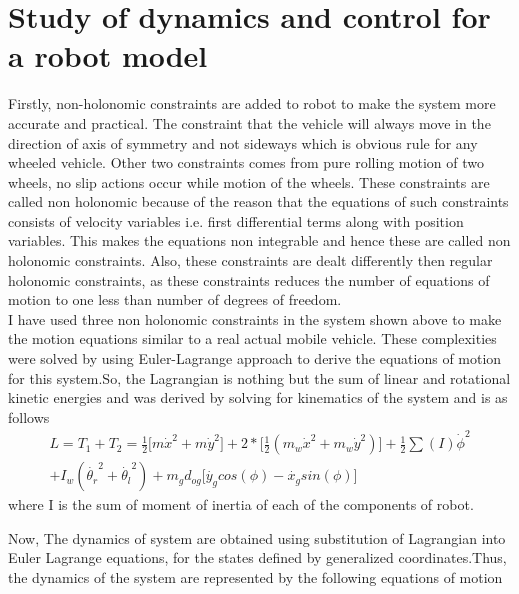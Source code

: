 \documentclass[12pt]{article}
\begin{document}
\section{Study of dynamics and control for a robot model}
Firstly, non-holonomic constraints are added to robot to make the system more accurate and practical. The constraint that the vehicle will always move in the direction of axis of symmetry and not sideways which is obvious rule for any wheeled vehicle. Other two constraints comes from pure rolling motion of two wheels, no slip actions occur while motion of the wheels. These constraints are called non holonomic because of the reason that the equations of such constraints consists of velocity variables i.e. first differential terms along with position variables. This makes the equations non integrable and hence these are called non holonomic constraints. Also, these constraints are dealt differently then regular holonomic constraints, as these constraints reduces the number of equations of motion to one less than number of degrees of freedom. 
\\ I have used three non holonomic constraints in the system shown above to make the motion equations similar to a real actual mobile vehicle. These complexities were solved by using Euler-Lagrange approach to derive the equations of motion for this system.So, the Lagrangian is nothing but the sum of linear and rotational kinetic energies and was derived by solving for kinematics of the system and is as follows
\begin{equation}
\begin{split}
    L=T_1+T_2=\frac{1}{2}\biggl[m\dot{x}^2+m\dot{y}^2\biggr]+2*\biggl[\frac{1}{2}(m_w\dot{x}^2+m_w\dot{y}^2)\biggr]+\frac{1}{2}\sum(I)\dot{\phi}^2
\\
 +I_w(\dot{\theta_r}^2+\dot{\theta_l}^2)+m_gd_{og}\biggl[\dot{y_g}cos(\phi)-\dot{x_g}sin(\phi)\biggr]
\end{split}
\end{equation}
where I is the sum of moment of inertia of each of the components of robot.

Now, The dynamics of system are obtained using substitution of Lagrangian into Euler Lagrange equations, for the states defined by generalized coordinates.Thus, the dynamics of the system are represented by the following equations of motion
\end{document}
